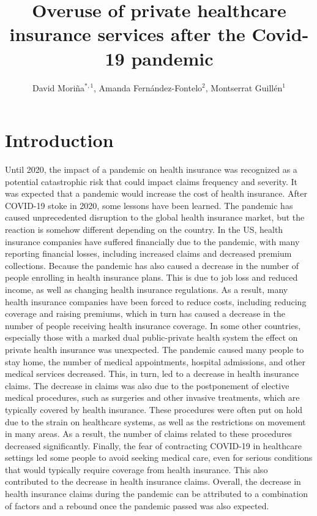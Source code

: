 \documentclass[12pt]{article}
\title{Overuse of private healthcare insurance services after the Covid-19 pandemic}
\author{David Mori\~na$^{*,1}$, Amanda Fern\'andez-Fontelo$^2$, Montserrat Guill\'en$^1$}
\theoremstyle{definition}
\theoremstyle{remark}
\begin{document}
\maketitle


\section{Introduction}\label{intro}
Until 2020, the impact of a pandemic on health insurance was recognized as a potential catastrophic risk that could impact claims frequency and severity. It was expected that a pandemic would increase the cost of health insurance. 
After COVID-19 stoke in 2020, some lessons have been learned. The pandemic has caused unprecedented disruption to the global health insurance market, but the reaction is somehow different depending on the country. In the US, health insurance companies have suffered financially due to the pandemic, with many reporting financial losses, including increased claims and decreased premium collections. Because the pandemic has also caused a decrease in the number of people enrolling in health insurance plans. This is due to job loss and reduced income, as well as changing health insurance regulations. As a result, many health insurance companies have been forced to reduce costs, including reducing coverage and raising premiums, which in turn has caused a decrease in the number of people receiving health insurance coverage.
In some other countries, especially those with a marked dual public-private health system the effect on private health insurance was unexpected. The pandemic caused many people to stay home, the number of medical appointments, hospital admissions, and other medical services decreased. This, in turn, led to a decrease in health insurance claims. The decrease in claims was also due to the postponement of elective medical procedures, such as surgeries and other invasive treatments, which are typically covered by health insurance. These procedures were often put on hold due to the strain on healthcare systems, as well as the restrictions on movement in many areas. As a result, the number of claims related to these procedures decreased significantly. Finally, the fear of contracting COVID-19 in healthcare settings led some people to avoid seeking medical care, even for serious conditions that would typically require coverage from health insurance. This also contributed to the decrease in health insurance claims. Overall, the decrease in health insurance claims during the pandemic can be attributed to a combination of factors and a rebound once the pandemic passed was also expected.
\end{document}
